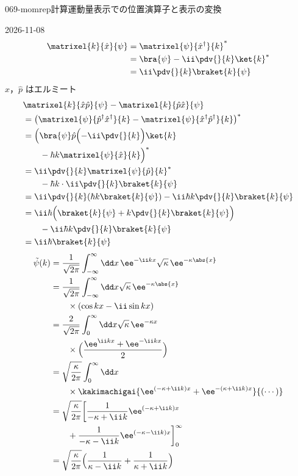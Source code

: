 \documentclass[uplatex,dvipdfmx,a4paper,11pt]{jsarticle}
\begin{document}
\begin{mondai}{069-momrep}{計算}{運動量表示での位置演算子と表示の変換}
\begin{kotaeutsushi}{2026-11-08}
\begin{align*}
\matrixel{k}{\hat{x}}{\psi}&=\matrixel{\psi}{\hat{x}^{\dagger}}{k}^{*}\\
&=\bra{\psi}-\ii\pdv{}{k}\ket{k}^{*}\\
&=\ii\pdv{}{k}\braket{k}{\psi}
\end{align*}
$\hat{x}$，$\hat{p}$ はエルミート
\begin{align*}
&\matrixel{k}{\hat{x}\hat{p}}{\psi}-\matrixel{k}{\hat{p}\hat{x}}{\psi}\\
&=\bigl(\matrixel{\psi}{\hat{p}^{\dagger}\hat{x}^{\dagger}}{k}-\matrixel{\psi}{\hat{x}^{\dagger}\hat{p}^{\dagger}}{k}\bigr)^{*}\\
&=\Bigl(\bra{\psi}\hat{p}\Bigl(-\ii\pdv{}{k}\Bigr)\ket{k}\\
&\qquad-\hbar k\matrixel{\psi}{\hat{x}}{k}\Bigr)^{*}\\
&=\ii\pdv{}{k}\matrixel{\psi}{\hat{p}}{k}^{*}\\
&\qquad-\hbar k\cdot\ii\pdv{}{k}\braket{k}{\psi}\\
&=\ii\pdv{}{k}(\hbar k\braket{k}{\psi})-\ii\hbar k\pdv{}{k}\braket{k}{\psi}\\
&=\ii\hbar\Bigl(\braket{k}{\psi}+k\pdv{}{k}\braket{k}{\psi}\Bigr)\\
&\qquad-\ii\hbar k\pdv{}{k}\braket{k}{\psi}\\
&=\ii\hbar\braket{k}{\psi}
\end{align*}
\begin{align*}
\tilde{\psi}(k)&=\frac{1}{\sqrt{2\pi}}\int_{-\infty}^{\infty}\dd x\,\ee^{-\ii kx}\sqrt{\kappa}\,\ee^{-\kappa\abs{x}}\\
&=\frac{1}{\sqrt{2\pi}}\int_{-\infty}^{\infty}\dd x\sqrt{\kappa}\,\ee^{-\kappa\abs{x}}\\
&\qquad\times(\cos kx-\ii\sin kx)\\
&=\frac{2}{\sqrt{2\pi}}\int_{0}^{\infty}\dd x\sqrt{\kappa}\,\ee^{-\kappa x}\\
&\qquad\times\Bigl(\frac{\ee^{\ii kx}+\ee^{-\ii kx}}{2}\Bigr)\\
&=\sqrt{\frac{\kappa}{2\pi}}\int_{0}^{\infty}\dd x\\
&\qquad\times\kakimachigai{\ee^{(-\kappa+\ii k)x}+\ee^{-(\kappa+\ii k)x}}{(\cdots)}\\
&=\sqrt{\frac{\kappa}{2\pi}}\biggl[\frac{1}{-\kappa+\ii k}\ee^{(-\kappa+\ii k)x}\\
&\qquad+\frac{1}{-\kappa-\ii k}\ee^{(-\kappa-\ii k)x}\biggr]_{0}^{\infty}\\
&=\sqrt{\frac{\kappa}{2\pi}}\Bigl(\frac{1}{\kappa-\ii k}+\frac{1}{\kappa+\ii k}\Bigr)\\

\end{align*}
\end{kotaeutsushi}
\end{mondai}
\end{document}
